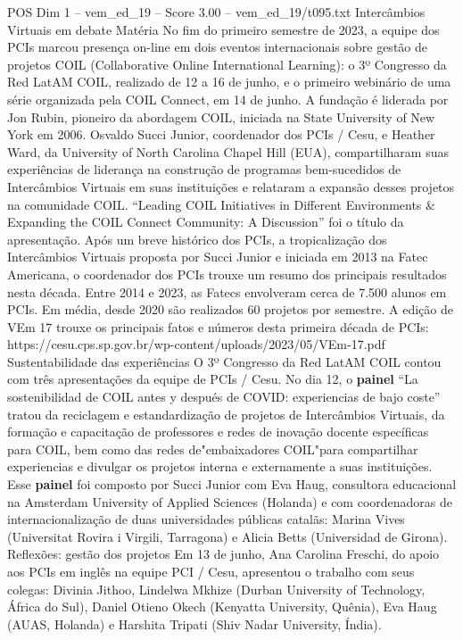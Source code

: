 \begin{textsample}{POS Dim 1 – vem\_ed\_19 – Score 3.00 – vem\_ed\_19/t095.txt}
Intercâmbios Virtuais em debate Matéria No fim do primeiro semestre de 2023, a equipe dos PCIs marcou presença on-line em dois eventos internacionais sobre gestão de projetos COIL (Collaborative Online International Learning): o 3º Congresso da Red LatAM COIL, realizado de 12 a 16 de junho, e o primeiro webinário de uma série organizada pela COIL Connect, em 14 de junho.
A fundação é liderada por Jon Rubin, pioneiro da abordagem COIL, iniciada na State University of New York em 2006.
Osvaldo Succi Junior, coordenador dos PCIs / Cesu, e Heather Ward, da University of North Carolina Chapel Hill (EUA), compartilharam suas experiências de liderança na construção de programas bem-sucedidos de Intercâmbios Virtuais em suas instituições e relataram a expansão desses projetos na comunidade COIL. “Leading COIL Initiatives in Different Environments \& Expanding the COIL Connect Community: A Discussion” foi o título da apresentação.
Após um breve histórico dos PCIs, a tropicalização dos Intercâmbios Virtuais proposta por Succi Junior e iniciada em 2013 na Fatec Americana, o coordenador dos PCIs trouxe um resumo dos principais resultados nesta década.
Entre 2014 e 2023, as Fatecs envolveram cerca de 7.500 alunos em PCIs.
Em média, desde 2020 são realizados 60 projetos por semestre.
A edição de VEm 17 trouxe os principais fatos e números desta primeira década de PCIs: https://cesu.cps.sp.gov.br/wp-content/uploads/2023/05/VEm-17.pdf Sustentabilidade das experiências O 3º Congresso da Red LatAM COIL contou com três apresentações da equipe de PCIs / Cesu.
No dia 12, o \textbf{painel} “La sostenibilidad de COIL antes y después de COVID: experiencias de bajo coste” tratou da reciclagem e estandardização de projetos de Intercâmbios Virtuais, da formação e capacitação de professores e redes de inovação docente específicas para COIL, bem como das redes de"embaixadores COIL"para compartilhar experiencias e divulgar os projetos interna e externamente a suas instituições.
Esse \textbf{painel} foi composto por Succi Junior com Eva Haug, consultora educacional na Amsterdam University of Applied Sciences (Holanda) e com coordenadoras de internacionalização de duas universidades públicas catalãs: Marina Vives (Universitat Rovira i Virgili, Tarragona) e Alicia Betts (Universidad de Girona).
Reflexões: gestão dos projetos Em 13 de junho, Ana Carolina Freschi, do apoio aos PCIs em inglês na equipe PCI / Cesu, apresentou o trabalho com seus colegas: Divinia Jithoo, Lindelwa Mkhize (Durban University of Technology, África do Sul), Daniel Otieno Okech (Kenyatta University, Quênia), Eva Haug (AUAS, Holanda) e Harshita Tripati (Shiv Nadar University, Índia).

\end{textsample}
